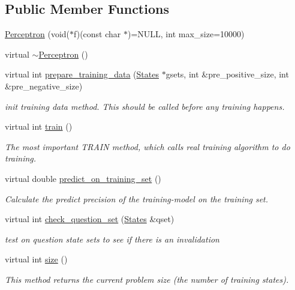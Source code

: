 \subsection*{Public Member Functions}
\begin{DoxyCompactItemize}
\item 
\hyperlink{classPerceptron_a74b79b672c7d5ac9d69c2f3f66ec09fa}{Perceptron} (void($\ast$f)(const char $\ast$)=N\+U\+LL, int max\+\_\+size=10000)
\item 
virtual \hyperlink{classPerceptron_a0267e40e981df9907129d858911840e7}{$\sim$\+Perceptron} ()
\item 
virtual int \hyperlink{classPerceptron_a2267c5acf9b4a7bd0f47522a530d3863}{prepare\+\_\+training\+\_\+data} (\hyperlink{classStates}{States} $\ast$gsets, int \&pre\+\_\+positive\+\_\+size, int \&pre\+\_\+negative\+\_\+size)
\begin{DoxyCompactList}\small\item\em init training data method. This should be called before any training happens. \end{DoxyCompactList}\item 
virtual int \hyperlink{classPerceptron_adc779991ee63dca333c12fb247b32c9d}{train} ()
\begin{DoxyCompactList}\small\item\em The most important T\+R\+A\+IN method, which calls real training algorithm to do training. \end{DoxyCompactList}\item 
virtual double \hyperlink{classPerceptron_ac9214d2cda4eeb9a06f6562bcb5df8ca}{predict\+\_\+on\+\_\+training\+\_\+set} ()
\begin{DoxyCompactList}\small\item\em Calculate the predict precision of the training-\/model on the training set. \end{DoxyCompactList}\item 
virtual int \hyperlink{classPerceptron_ac7ed76c6a28180691f63f2afbf93cc26}{check\+\_\+question\+\_\+set} (\hyperlink{classStates}{States} \&qset)
\begin{DoxyCompactList}\small\item\em test on question state sets to see if there is an invalidation \end{DoxyCompactList}\item 
virtual int \hyperlink{classPerceptron_a50b1f76eb2760b540477135100dcbf49}{size} ()
\begin{DoxyCompactList}\small\item\em This method returns the current problem size (the number of training states). \end{DoxyCompactList}\item 

\end{DoxyCompactItemize}
